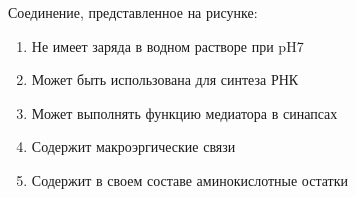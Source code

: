 
Соединение, представленное на рисунке:


\begin{enumerate}
    \item Не имеет заряда в водном растворе при pH7
    \item Может быть использована для синтеза РНК
    \item Может выполнять функцию медиатора в синапсах 
    \item Содержит макроэргические связи 
    \item Содержит в своем составе аминокислотные остатки
\end{enumerate}

